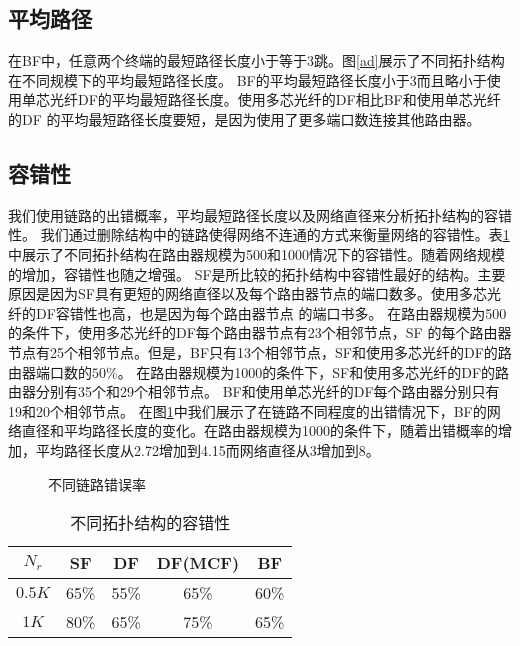 \subsection{平均路径}

在BF中，任意两个终端的最短路径长度小于等于3跳。图\ref{ad}展示了不同拓扑结构在不同规模下的平均最短路径长度。
BF的平均最短路径长度小于3而且略小于使用单芯光纤DF的平均最短路径长度。使用多芯光纤的DF相比BF和使用单芯光纤的DF
的平均最短路径长度要短，是因为使用了更多端口数连接其他路由器。

\subsection{容错性}

我们使用链路的出错概率，平均最短路径长度以及网络直径来分析拓扑结构的容错性。
我们通过删除结构中的链路使得网络不连通的方式来衡量网络的容错性。表\ref{Table3}中展示了不同拓扑结构在路由器规模为500和1000情况下的容错性。随着网络规模的增加，容错性也随之增强。
SF是所比较的拓扑结构中容错性最好的结构。主要原因是因为SF具有更短的网络直径以及每个路由器节点的端口数多。使用多芯光纤的DF容错性也高，也是因为每个路由器节点
的端口书多。
在路由器规模为500的条件下，使用多芯光纤的DF每个路由器节点有23个相邻节点，SF 的每个路由器节点有25个相邻节点。但是，BF只有13个相邻节点，SF和使用多芯光纤的DF的路由器端口数的$50\%$。
在路由器规模为1000的条件下，SF和使用多芯光纤的DF的路由器分别有35个和29个相邻节点。
BF和使用单芯光纤的DF每个路由器分别只有19和20个相邻节点。
在图\ref{r}中我们展示了在链路不同程度的出错情况下，BF的网络直径和平均路径长度的变化。在路由器规模为1000的条件下，随着出错概率的增加，平均路径长度从2.72增加到4.15而网络直径从3增加到8。


\begin{figure}[t]
\setlength{\belowcaptionskip}{-.3cm}%
  \centering
 \begin{minipage}[t]{\textwidth}
   \centering
  \vspace{-.3cm}
  \caption{不同链路错误率}
  \label{r}
  \end{minipage}

\end{figure}

\begin{table}[t]
\caption{不同拓扑结构的容错性}
\centering
\begin{tabular}{c|c| c| c |c }\hline
  \centering
  $N_r$ & SF &DF &DF(MCF) &BF	\\\hline
  $0.5K$ &65\%  &55\%  &65\% &60\%\\
  $1K$	&80\%	&65\%  &75\% &65\% \\\hline
\end{tabular}
 \label{Table3}
\end{table}

